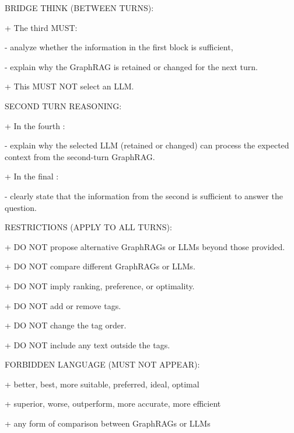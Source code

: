\begin{tcolorbox}[
    mygreenbox,
    enhanced jigsaw,
    width=\textwidth,
    notitle,
    before upper={
        \setlength{\parindent}{0pt}
        \setlength{\parskip}{0pt}
    }
]

BRIDGE THINK (BETWEEN TURNS):\par\noindent
+ The third  MUST:\par\noindent
\quad - analyze whether the information in the first  block is sufficient,\par\noindent
\quad - explain why the GraphRAG is retained or changed for the next turn.\par\noindent
+ This  MUST NOT select an LLM.\par\noindent

\medskip
SECOND TURN REASONING:\par\noindent
+ In the fourth :\par\noindent
\quad - explain why the selected LLM (retained or changed) can process
    the expected context from the second-turn GraphRAG.\par\noindent
+ In the final :\par\noindent
\quad - clearly state that the information from the second 
    is sufficient to answer the question.\par\noindent

\medskip
RESTRICTIONS (APPLY TO ALL TURNS):\par\noindent
+ DO NOT propose alternative GraphRAGs or LLMs beyond those provided.\par\noindent
+ DO NOT compare different GraphRAGs or LLMs.\par\noindent
+ DO NOT imply ranking, preference, or optimality.\par\noindent
+ DO NOT add or remove tags.\par\noindent
+ DO NOT change the tag order.\par\noindent
+ DO NOT include any text outside the tags.\par\noindent

\medskip
FORBIDDEN LANGUAGE (MUST NOT APPEAR):\par\noindent
+ better, best, more suitable, preferred, ideal, optimal\par\noindent
+ superior, worse, outperform, more accurate, more efficient\par\noindent
+ any form of comparison between GraphRAGs or LLMs\par\noindent


\end{tcolorbox}

